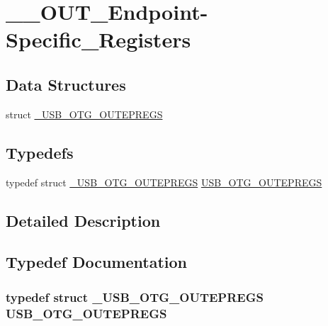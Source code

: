 \hypertarget{group_______o_u_t___endpoint-_specific___registers}{\section{\-\_\-\-\_\-\-O\-U\-T\-\_\-\-Endpoint-\/\-Specific\-\_\-\-Registers}
\label{group_______o_u_t___endpoint-_specific___registers}
}
\subsection*{Data Structures}
\begin{DoxyCompactItemize}
\item 
struct \hyperlink{struct___u_s_b___o_t_g___o_u_t_e_p_r_e_g_s}{\-\_\-\-U\-S\-B\-\_\-\-O\-T\-G\-\_\-\-O\-U\-T\-E\-P\-R\-E\-G\-S}
\end{DoxyCompactItemize}
\subsection*{Typedefs}
\begin{DoxyCompactItemize}
\item 
typedef struct \hyperlink{struct___u_s_b___o_t_g___o_u_t_e_p_r_e_g_s}{\-\_\-\-U\-S\-B\-\_\-\-O\-T\-G\-\_\-\-O\-U\-T\-E\-P\-R\-E\-G\-S} \hyperlink{group_______o_u_t___endpoint-_specific___registers_ga5247fff61d820ab0db3e6d8df0441a03}{U\-S\-B\-\_\-\-O\-T\-G\-\_\-\-O\-U\-T\-E\-P\-R\-E\-G\-S}
\end{DoxyCompactItemize}


\subsection{Detailed Description}


\subsection{Typedef Documentation}
\hypertarget{group_______o_u_t___endpoint-_specific___registers_ga5247fff61d820ab0db3e6d8df0441a03}{
\subsubsection[{U\-S\-B\-\_\-\-O\-T\-G\-\_\-\-O\-U\-T\-E\-P\-R\-E\-G\-S}]{\setlength{\rightskip}{0pt plus 5cm}typedef struct {\bf \-\_\-\-U\-S\-B\-\_\-\-O\-T\-G\-\_\-\-O\-U\-T\-E\-P\-R\-E\-G\-S}
 {\bf U\-S\-B\-\_\-\-O\-T\-G\-\_\-\-O\-U\-T\-E\-P\-R\-E\-G\-S}}}\label{group_______o_u_t___endpoint-_specific___registers_ga5247fff61d820ab0db3e6d8df0441a03}
